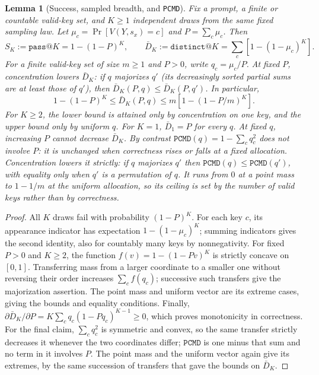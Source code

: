 \documentclass{article}
\newcommand{\1}{\mathbf 1}
\newcommand{\pmd}{\texttt{PCMD}}
\newtheorem{lemma}{Lemma}[section]
\theoremstyle{remark}
\theoremstyle{definition}
\theoremstyle{plain}
\begin{document}
\begin{lemma}[Success, sampled breadth, and \pmd{}]
\label{lem:success-breadth}
Fix a prompt, a finite or countable valid-key set, and $K\ge1$ independent
draws from the same fixed sampling law. Let
$\mu_c=\Pr[V(Y,s_x)=c]$ and $P=\sum_c\mu_c$. Then
\begin{equation}
 S_K:=\texttt{pass@}K=1-(1-P)^K,\qquad
 \bar D_K:=\texttt{distinct@}K=\sum_c[1-(1-\mu_c)^K].
 \label{eq:success-breadth-identities}
\end{equation}
For a finite valid-key set of size $m\ge1$ and $P>0$, write $q_c=\mu_c/P$.
At fixed $P$, concentration lowers $\bar D_K$: if $q$ majorizes $q'$
(its decreasingly sorted partial sums are at least those of $q'$), then
$\bar D_K(P,q)\le\bar D_K(P,q')$. In particular,
\begin{equation}
 1-(1-P)^K\le\bar D_K(P,q)\le m[1-(1-P/m)^K].
 \label{eq:fixed-success-breadth-bounds}
\end{equation}
For $K\ge2$, the lower bound is attained only by concentration on one key,
and the upper bound only by uniform $q$. For $K=1$, $\bar D_1=P$ for every $q$.
At fixed $q$, increasing $P$ cannot decrease $\bar D_K$.
By contrast $\pmd(q)=1-\sum_c q_c^2$ does not involve $P$: it is unchanged when
correctness rises or falls at a fixed allocation. Concentration lowers it
strictly: if $q$ majorizes $q'$ then $\pmd(q)\le\pmd(q')$, with equality only
when $q'$ is a permutation of $q$. It runs from $0$ at a point mass to
$1-1/m$ at the uniform allocation, so its ceiling is set by the number of
valid keys rather than by correctness.
\end{lemma}
\begin{proof}
All $K$ draws fail with probability $(1-P)^K$. For each key $c$, its
appearance indicator has expectation $1-(1-\mu_c)^K$; summing indicators
gives the second identity, also for countably many keys by nonnegativity.
For fixed $P>0$ and $K\ge2$, the function
$f(v)=1-(1-Pv)^K$ is strictly concave on $[0,1]$.
Transferring mass from a larger coordinate to a smaller one without reversing
their order increases $\sum_c f(q_c)$; successive such transfers give the
majorization assertion. The point mass and uniform vector are its extreme
cases, giving the bounds and equality conditions. Finally,
$\partial\bar D_K/\partial P=K\sum_c q_c(1-Pq_c)^{K-1}\ge0$,
which proves monotonicity in correctness.
For the final claim, $\sum_c q_c^2$ is symmetric and convex, so the
same transfer strictly decreases it whenever the two coordinates differ;
$\pmd$ is one minus that sum and no term in it involves $P$. The point mass and
the uniform vector again give its extremes, by the same succession of transfers
that gave the bounds on $\bar D_K$.
\end{proof}
\end{document}
